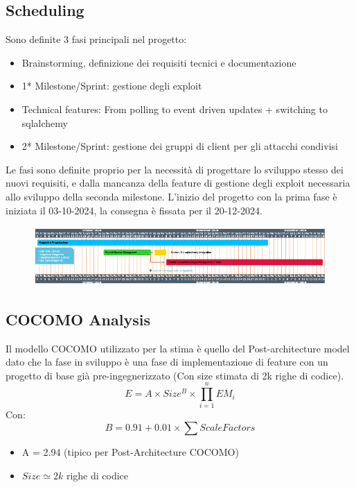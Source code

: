 \documentclass[11pt]{article}
\begin{document}
\subsection{Scheduling}
Sono definite 3 fasi principali nel progetto:
\begin{itemize}
    \item Brainstorming, definizione dei requisiti tecnici e documentazione
    \item 1* Milestone/Sprint: gestione degli exploit
    \item Technical features: From polling to event driven updates + switching to sqlalchemy
    \item 2* Milestone/Sprint: gestione dei gruppi di client per gli attacchi condivisi
\end{itemize}
Le fasi sono definite proprio per la necessità di progettare lo sviluppo stesso dei nuovi requisiti, e dalla mancanza della feature di gestione degli exploit necessaria allo sviluppo della seconda milestone.
L'inizio del progetto con la prima fase è iniziata il 03-10-2024, la consegna è fissata per il 20-12-2024.
	\begin{figure}[H]
		\centering
    	\includegraphics[width=1\textwidth]{scheduling.png}
	\end{figure}
\subsection{COCOMO Analysis}
Il modello COCOMO utilizzato per la stima è quello del Post-architecture model dato che la fase in sviluppo è una fase di implementazione di feature con un progetto di base già pre-ingegnerizzato (Con size stimata di 2k righe di codice).
   \[ E = A \times Size^B \times \prod_{i=1}^{n} EM_i \]
   Con:
   \[ B = 0.91 + 0.01 \times \sum Scale Factors \]
   \begin{itemize}
   		\item A = 2.94 (tipico per Post-Architecture COCOMO)
		\item $Size \simeq 2k$ righe di codice
   \end{itemize}
\end{document}
